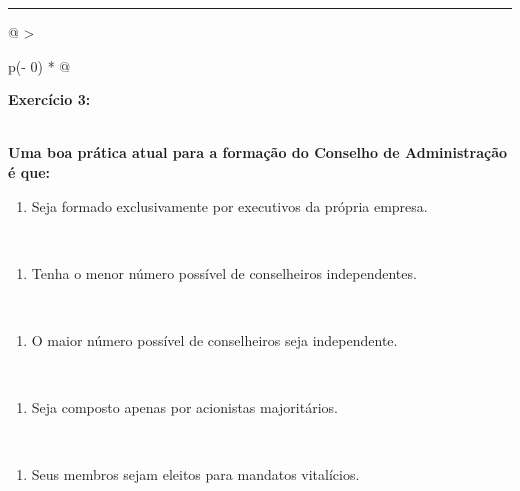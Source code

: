 \documentclass[
]{book}
\providecommand{\tightlist}{%
  \setlength{\itemsep}{0pt}\setlength{\parskip}{0pt}}
\begin{document}
\begin{center}\rule{0.5\linewidth}{0.5pt}\end{center}

\begin{longtable}[]{@{}
  >{\raggedright\arraybackslash}p{(\columnwidth - 0\tabcolsep) * }@{}}
\toprule\noalign{}
\begin{minipage}[b]{\linewidth}\raggedright
\textbf{Exercício 3:}
\end{minipage} \\
\midrule\noalign{}
\endhead
\bottomrule\noalign{}
\endlastfoot
\textbf{Uma boa prática atual para a formação do Conselho de Administração é que:} \\
\begin{minipage}[t]{\linewidth}\raggedright
\begin{enumerate}
\def\labelenumi{\alph{enumi})}
\tightlist
\item
  Seja formado exclusivamente por executivos da própria empresa.
\end{enumerate}
\end{minipage} \\
\begin{minipage}[t]{\linewidth}\raggedright
\begin{enumerate}
\def\labelenumi{\alph{enumi})}
\setcounter{enumi}{1}
\tightlist
\item
  Tenha o menor número possível de conselheiros independentes.
\end{enumerate}
\end{minipage} \\
\begin{minipage}[t]{\linewidth}\raggedright
\begin{enumerate}
\def\labelenumi{\alph{enumi})}
\setcounter{enumi}{2}
\tightlist
\item
  O maior número possível de conselheiros seja independente.
\end{enumerate}
\end{minipage} \\
\begin{minipage}[t]{\linewidth}\raggedright
\begin{enumerate}
\def\labelenumi{\alph{enumi})}
\setcounter{enumi}{3}
\tightlist
\item
  Seja composto apenas por acionistas majoritários.
\end{enumerate}
\end{minipage} \\
\begin{minipage}[t]{\linewidth}\raggedright
\begin{enumerate}
\def\labelenumi{\alph{enumi})}
\setcounter{enumi}{4}
\tightlist
\item
  Seus membros sejam eleitos para mandatos vitalícios.
\end{enumerate}
\end{minipage} \\
\end{longtable}
\end{document}
